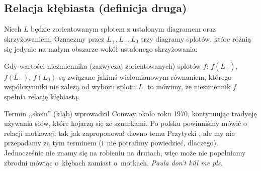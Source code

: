 
\subsection{Relacja kłębiasta (definicja druga)}

\begin{definition}
\label{skein_symbols}%
%
    Niech $L$ będzie zorientowanym splotem z ustalonym diagramem oraz skrzyżowaniem.
    Oznaczmy przez $L_+, L_-, L_0$ trzy diagramy splotów, które różnią się jedynie na małym obszarze wokół ustalonego skrzyżowania:

\noindent
Gdy wartości niezmiennika (zazwyczaj zorientowanych) splotów $f$: $f(L_+)$, $f(L_-)$, $f(L_0)$ są związane jakimś wielomianowym równaniem, którego współczynniki nie zależą od wyboru splotu $L$, to mówimy, że niezmiennik $f$ spełnia relację kłębiastą.
\end{definition}

Termin ,,skein'' (kłąb) wprowadził Conway około roku 1970, kontynuując tradycję używania słów, które kojarzą się ze sznurkami.
%
Po polsku powinniśmy mówić o relacji motkowej, tak jak zaproponował dawno temu Przytycki \cite[s. 172]{przytycki1995}, ale my nie przepadamy za tym terminem (i~nie potrafimy powiedzieć, dlaczego).
Jednocześnie nie znamy się na robieniu na drutach, więc może nie popełniamy zbrodni mówiąc o~kłębach zamiast o~motkach.
\emph{Paula don't kill me pls.}

